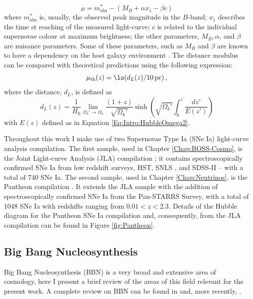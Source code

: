\begin{equation}
    \mu = m_{\text{obs}}^* - (M_B + \alpha x_1 - \beta c)
\end{equation}
where $m_{\text{obs}}^*$ is, usually, the observed peak magnitude in the $B$-band; $x_1$ describes the time st reaching of the measured light-curve; $c$ is related to the individual supernovae colour at maximum brightness; the other parameters, $M_B, \alpha$, and $\beta$ are nuisance parameters. Some of these parameters, such as $M_B$ and $\beta$ are known to have a dependency on the host galaxy environment \citep{2011Sullivan}. The distance modulus can be compared with theoretical predictions using the following expression:
\begin{equation}
    \mu_{\text{th}}(z) = \lo(d_L(z)/10\, \text{pc})\, ,
\end{equation}
where the distance, $d_L$, is defined as 
\begin{equation}
    d_L(z) = \frac{1}{H_0}\lim_{\Omega_k' \rightarrow \Omega_k}\frac{(1+z)}{\sqrt{\Omega_k'}}\sinh\left( \sqrt{\Omega_k'}\int_0^z\frac{dz'}{E(z')}\right)
\end{equation}
with $E(z)$ defined as in Equation \eqref{Eq:Intro:HubbleOmega2}.

\qquad Throughout this work I make use of two Supernovae Type Ia (SNe Ia) light-curve analysis compilation. The first sample, used in Chapter \ref{Chap:BOSS-Cosmo}, is the Joint Light-curve Analysis (JLA) compilation \citep{JLAdata}; it contains spectroscopically confirmed SNe Ia from low redshift surveys, HST, SNLS \citep{2011Conley}, and SDSS-II \citep{2018Sako} -- with a total of 740 SNe Ia. The second sample, used in Chapter \ref{Chap:Neutrinos}, is the Pantheon compilation \citep{2018Pantheon}. It extends the JLA sample with the addition of spectroscopically confirmed SNe Ia from the Pan-STARRS Survey, with a total of 1048 SNe Ia with redshifts ranging from $0.01 < z < 2.3$. Details of the Hubble diagram for the Pantheon SNe Ia compilation and, consequently, from the JLA compilation can be found in Figure \ref{fig:Pantheon}.

\subsection{Big Bang Nucleosynthesis}
Big Bang Nucleosynthesis (BBN) is a very broad and extensive area of cosmology, here I present a brief review of the areas of this field relevant for the present work. A complete review on BBN can be found in \cite{2007Steingman-BBN} and, more recently, \cite{2016Particle-Review}.

